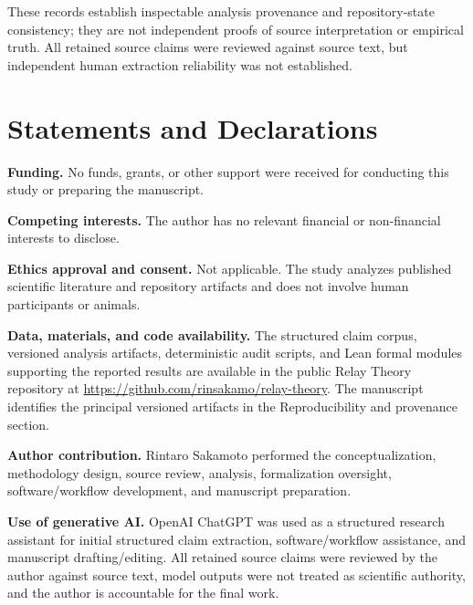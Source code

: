 \documentclass[11pt]{article}
\begin{document}
These records establish inspectable analysis provenance and repository-state consistency; they are not independent proofs of source interpretation or empirical truth. All retained source claims were reviewed against source text, but independent human extraction reliability was not established.

\section*{Statements and Declarations}

\textbf{Funding.} No funds, grants, or other support were received for conducting this study or preparing the manuscript.

\textbf{Competing interests.} The author has no relevant financial or non-financial interests to disclose.

\textbf{Ethics approval and consent.} Not applicable. The study analyzes published scientific literature and repository artifacts and does not involve human participants or animals.

\textbf{Data, materials, and code availability.} The structured claim corpus, versioned analysis artifacts, deterministic audit scripts, and Lean formal modules supporting the reported results are available in the public Relay Theory repository at \url{https://github.com/rinsakamo/relay-theory}. The manuscript identifies the principal versioned artifacts in the Reproducibility and provenance section.

\textbf{Author contribution.} Rintaro Sakamoto performed the conceptualization, methodology design, source review, analysis, formalization oversight, software/workflow development, and manuscript preparation.

\textbf{Use of generative AI.} OpenAI ChatGPT was used as a structured research assistant for initial structured claim extraction, software/workflow assistance, and manuscript drafting/editing. All retained source claims were reviewed by the author against source text, model outputs were not treated as scientific authority, and the author is accountable for the final work.




\end{document}
